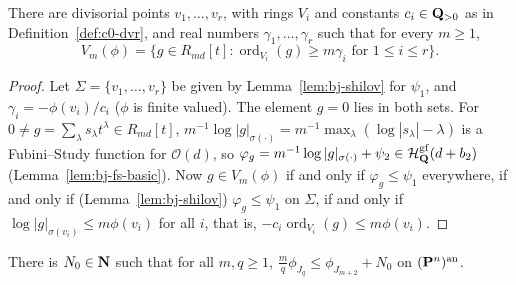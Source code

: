 \begin{lemma}\label{lem:c0-shilov-description}
\leanok
{}
There are divisorial points $v_1,\dots,v_r$, with rings $V_i$ and constants $c_i\in\mathbf{Q}_{>0}$ as in Definition~\ref{def:c0-dvr}, and real numbers
$\gamma_1,\dots,\gamma_r$ such that for every $m\ge1$,
\[
V_m(\phi)=\{g\in R_{md}[t]:\operatorname{ord}_{V_i}(g)\ge m\gamma_i\text{ for }1\le i\le r\}.
\]
\end{lemma}

\begin{proof}
Let $\Sigma=\{v_1,\dots,v_r\}$ be given by Lemma~\ref{lem:bj-shilov} for $\psi_1$, and $\gamma_i=-\phi(v_i)/c_i$ ($\phi$ is finite valued). The element
$g=0$ lies in both sets. For $0\ne g=\sum_\lambda s_\lambda t^\lambda\in R_{md}[t]$, $m^{-1}\log|g|_{\sigma(\cdot)}=m^{-1}\max_\lambda(\log|s_\lambda|-\lambda)$ is a
Fubini--Study function for $\mathcal O(d)$, so $\varphi_g=m^{-1}\log|g|_{\sigma(\cdot)}+\psi_2\in\mathcal H^{\mathrm{gf}}_{\mathbf{Q}}(d+b_2)$
(Lemma~\ref{lem:bj-fs-basic}). Now $g\in V_m(\phi)$ if and only if $\varphi_g\le\psi_1$ everywhere, if and only if (Lemma~\ref{lem:bj-shilov})
$\varphi_g\le\psi_1$ on $\Sigma$, if and only if $\log|g|_{\sigma(v_i)}\le m\phi(v_i)$ for all $i$, that is, $-c_i\operatorname{ord}_{V_i}(g)\le m\phi(v_i)$.
\end{proof}

\begin{proposition}\label{prop:c0-key-inequality}
\leanok
{}
There is $N_0\in\mathbf{N}$ such that for all $m,q\ge1$, $\frac mq\phi_{J_q}\le\phi_{J_{m+2}}+N_0$ on $(\mathbf{P}^n)^{\mathrm{an}}$.
\end{proposition}

